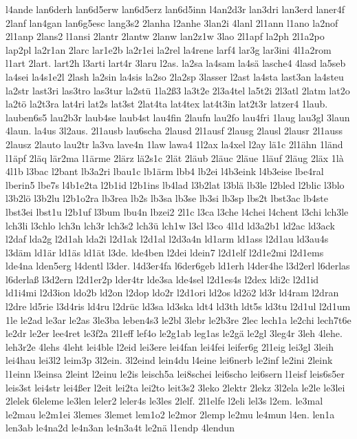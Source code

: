 {l4ande
lan6derh
lan6d5erw
lan6d5erz
lan6d5inn
l4an2d3r
lan3dri
lan3erd
laner4f
2lanf
lan4gan
lan6g5esc
lang3s2
2lanha
l2anhe
3lan2i
4lanl
2l1ann
l1ano
la2nof
2l1anp
2lans2
l1ansi
2lantr
2lantw
2lanw
lan2z1w
3lao
2l1apf
la2ph
2l1a2po
lap2pl
la2r1an
2larc
lar1e2b
la2r1ei
la2rel
la4rene
larf4
lar3g
lar3ini
4l1a2rom
l1art
2lart.
lart2h
l3arti
lart4r
3laru
l2as.
la2sa
la4sam
la4sä
lasche4
4lasd
la5seb
la4sei
la4s1e2l
2lash
la2sin
la4sis
la2so
2la2sp
3lasser
l2ast
la4sta
last3an
la4steu
la2str
last3ri
las3tro
las3tur
la2stü
1la2ß3
la3t2e
2l3a4tel
la5t2i
2l3atl
2latm
lat2o
la2tö
la2t3ra
lat4ri
lat2s
lat3st
2lat4ta
lat4tex
lat4t3in
lat2t3r
latzer4
1laub.
lauben6s5
lau2b3r
laub4se
laub4st
lau4fin
2laufn
lau2fo
lau4fri
1laug
lau3gl
3laun
4laun.
la4us
3l2aus.
2l1ausb
lau6scha
2lausd
2l1ausf
2lausg
2lausl
2lausr
2l1auss
2lausz
2lauto
lau2tr
la3va
lave4n
1law
lawa4
1l2ax
la4xel
l2ay
lä1c
2l1ähn
1länd
l1äpf
2läq
lär2ma
l1ärme
2lärz
lä2s1c
2lät
2läub
2läuc
2läue
1läuf
2läug
2läx
1là
4l1b
l3bac
l2bant
lb3a2ri
lbau1c
lb1ärm
lbb4
lb2ei
l4b3eink
l4b3eise
lbe4ral
lberin5
lbe7s
l4b1e2ta
l2b1id
l2b1ins
lb4lad
l3b2lat
l3blä
lb3le
l2bled
l2blic
l3blo
l3b2lö
l3b2lu
l2b1o2ra
lb3rea
lb2s
lb3sa
lb3se
lb3si
lb3sp
lbs2t
lbst3ac
lb4ste
lbst3ei
lbst1u
l2b1uf
l3bum
lbu4n
lbzei2
2l1c
l3ca
l3che
l4chei
l4chent
l3chi
lch3le
lch3li
l3chlo
lch3n
lch3r
lch3s2
lch3ü
lch1w
l3cl
l3co
4l1d
ld3a2b1
ld2ac
ld3ack
l2daf
lda2g
l2d1ah
lda2i
l2d1ak
l2d1al
l2d3a4n
ld1arm
ld1ass
l2d1au
ld3au4s
l3däm
ld1är
ld1äs
ld1ät
l3de.
lde4ben
l2dei
ldein7
l2d1elf
l2d1e2mi
l2d1ems
lde4na
lden5erg
l4dentl
l3der.
l4d3er4fa
l6der6geb
ld1erh
l4der4he
l3d2erl
l6derlas
l6derlaß
l3d2ern
l2d1er2p
lder4tr
lde3sa
lde4sel
l2d1es4s
l2dex
ldi2c
l2d1id
ld1i4mi
l2d3ion
ldo2b
ld2on
l2dop
ldo2r
l2d1ori
ld2os
ld2ö2
ld3r
ld4ram
l2dran
l2dre
ld5rie
l3d4ris
ld4ru
l2drüc
ld3sa
ld3ska
ldt4
ld3th
ldt5s
ld3tu
l2d1ul
l2d1um
1le
le2ad
le3ar
le2as
3le3ba
leben4s3
le2bl
3lebr
le2b3re
2lec
lech1a
le2chi
lech7t6e
le2dr
le2er
lee4ret
le3f2a
2l1eff
lef4o
le2g1ab
leg1as
le2gä
le2gl
3leg4r
3leh
4lehe.
leh3r2e
4lehs
4leht
lei4ble
l2eid
lei3ere
lei4fan
lei4fei
leifer6g
2l1eig
lei3gl
3leih
lei4hau
lei3l2
leim3p
3l2ein.
3l2eind
lein4du
l4eine
lei6nerb
le2inf
le2ini
2leink
l1einn
l3einsa
2leint
l2einu
le2is
leisch5a
lei8schei
lei6scho
lei6sern
l1eisf
leis6s5er
leis3st
lei4str
lei4ßer
l2eit
lei2ta
lei2to
leit3s2
3leko
2lektr
2lekz
3l2ela
le2le
le3lei
2lelek
6leleme
le3len
leler2
leler4s
le3les
2lelf.
2l1elfe
l2eli
lel3s
l2em.
le3mal
le2mau
le2m1ei
3lemes
3lemet
lem1o2
le2mor
2lemp
le2mu
le4mun
l4en.
len1a
len3ab
le4na2d
le4n3an
le4n3a4t
le2nä
l1endp
4lendun
}
